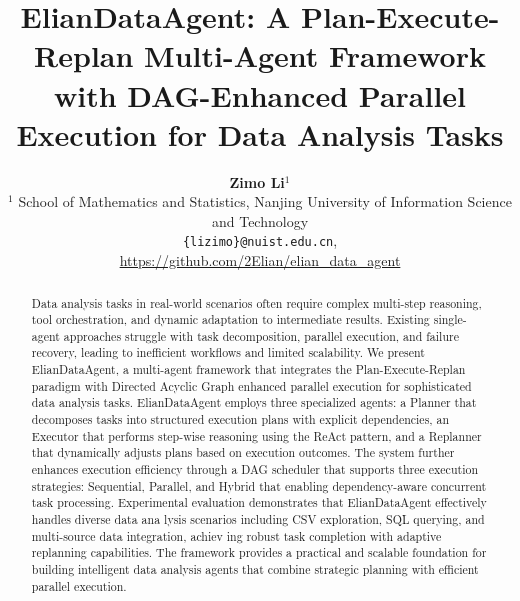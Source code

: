 \documentclass{article}
\title{ElianDataAgent: A Plan-Execute-Replan Multi-Agent Framework with DAG-Enhanced Parallel Execution for Data Analysis Tasks}
\author{
  \textbf{Zimo Li}$^{1}$\footnotemark[1] \\
  $^1$ School of Mathematics and Statistics, Nanjing University of Information Science and Technology \\
  \texttt{\{lizimo\}@nuist.edu.cn}, \\
  \textcolor{red}{\url{https://github.com/2Elian/elian_data_agent}}
}
\theoremstyle{definition}
\begin{document}
\renewcommand{\thefootnote}{\fnsymbol{footnote}}
\maketitle









\begin{abstract}
Data analysis tasks in real-world scenarios often require complex multi-step reasoning,
tool orchestration, and dynamic adaptation to intermediate results.
 Existing single-agent approaches struggle with task decomposition, 
 parallel execution, and failure recovery, leading to inefficient workflows and limited scalability. 
 We present ElianDataAgent, 
 a multi-agent framework that integrates the Plan-Execute-Replan paradigm with Directed Acyclic 
 Graph enhanced parallel execution for sophisticated data analysis tasks.
ElianDataAgent employs three specialized agents: a Planner that decomposes tasks into structured execution 
plans with explicit dependencies, an Executor that performs step-wise reasoning using the ReAct 
pattern, and a Replanner that dynamically adjusts plans based on execution outcomes. 
The system further enhances execution efficiency through a DAG scheduler that supports three execution 
strategies: Sequential, Parallel, and Hybrid that enabling dependency-aware concurrent task processing.
Experimental evaluation demonstrates that ElianDataAgent effectively handles diverse data ana
lysis scenarios including CSV exploration, SQL querying, and multi-source data integration, achiev
ing robust task completion with adaptive replanning capabilities. The framework provides a practical
 and scalable foundation for building intelligent data analysis agents that combine strategic 
 planning with efficient parallel execution.
\end{abstract}
\end{document}
